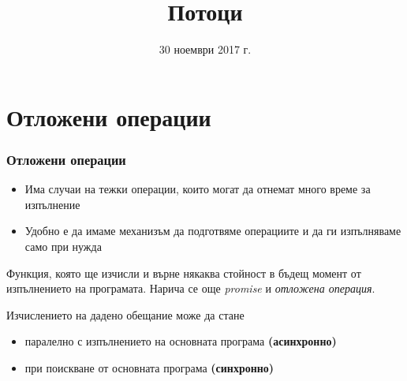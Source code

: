 \documentclass{beamer}
\title{Потоци}
\date{30 ноември 2017 г.}
\begin{document}
\begin{frame}
  \titlepage
\end{frame}

\section{Отложени операции}

\begin{frame}
  \frametitle{Отложени операции}

  \begin{itemize}[<+->]
  \item Има случаи на тежки операции, които могат да отнемат много време за изпълнение
  \item Удобно е да имаме механизъм да \alert{подготвяме} операциите и да ги \alert{изпълняваме} само при нужда
  \end{itemize}
  \onslide<+->
  \begin{definition}[Обещание]
    Функция, която ще изчисли и върне някаква стойност в бъдещ момент от изпълнението на програмата.
    \onslide<+->
    Нарича се още \emph{promise} и \emph{отложена операция}.
  \end{definition}
  \onslide<+->
  Изчислението на дадено обещание може да стане
  \begin{itemize}[<+->]
  \item паралелно с изпълнението на основната програма \textbf{(асинхронно)}
  \item при поискване от основната програма \textbf{(синхронно)}
  \end{itemize}
\end{frame}
\end{document}
